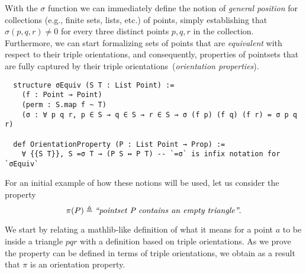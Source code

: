 With the $\sigma$ function we can immediately define the notion of \emph{general position} for collections (e.g., finite sets, lists, etc.) of points, simply establishing that $\sigma(p, q, r) \neq 0$ for every three distinct points $p, q, r$ in the collection.
Furthermore, we can start formalizing sets of points that are \emph{equivalent} with respect to their triple orientations, and consequently, properties of pointsets that are fully captured by their triple orientations~(\emph{orientation properties}).



\begin{lstlisting}
  structure σEquiv (S T : List Point) :=
    (f : Point → Point)
    (perm : S.map f ~ T)
    (σ : ∀ p q r, p ∈ S → q ∈ S → r ∈ S → σ (f p) (f q) (f r) = σ p q r)

  def OrientationProperty (P : List Point → Prop) :=
    ∀ {{S T}}, S =σ T → (P S ↔ P T) -- `=σ` is infix notation for `σEquiv`
\end{lstlisting}


For an initial example of how these notions will be used, let us consider the property 
\[
  \pi(P) \triangleq \text{\em ``pointset P contains an empty triangle''}. 
\]

We start by relating a \textsf{mathlib}-like definition of what it means for a point $a$ to be inside a triangle $pqr$ with a definition based on triple orientations. As we prove the property can be defined in terms of triple orientations, we obtain as a result that $\pi$ is an orientation property.

